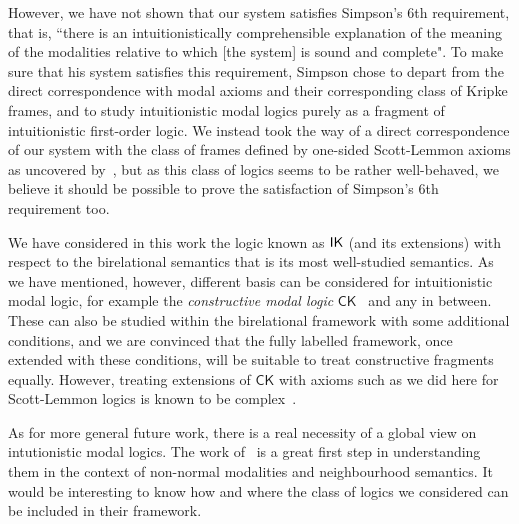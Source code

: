 However, we have not shown that our system satisfies Simpson's 6th requirement, that is, ``there is an intuitionistically comprehensible explanation of the meaning of the modalities relative to which [the system] is sound and complete".
%
To make sure that his system satisfies this requirement, Simpson chose to depart from the direct correspondence with modal axioms and their corresponding class of Kripke frames, and to study intuitionistic modal logics purely as a fragment of intuitionistic first-order logic.
%
We instead took the way of a direct correspondence of our system with the class of frames defined by one-sided Scott-Lemmon axioms as uncovered by~\cite{plotkin:stirling:86}, but as this class of logics seems to be rather well-behaved, we believe it should be possible to prove the satisfaction of Simpson's 6th requirement too.

We have considered in this work the logic known as $\mathsf{IK}$ (and its extensions) with respect to the birelational semantics that is its most well-studied semantics.
%
As we have mentioned, however, different basis can be considered for intuitionistic modal logic, for example the \emph{constructive modal logic} $\mathsf{CK}$~\cite{bierman:depaiva:sl00,mendler:scheele:ic11} and any in between.
%
These can also be studied within the birelational framework with some additional conditions, and we are convinced that the fully labelled framework, once extended with these conditions, will be suitable to treat constructive fragments equally.
%
However, treating extensions of $\mathsf{CK}$ with axioms such as we did here for Scott-Lemmon logics is known to be complex~\cite{arisaka:etal:lmcs15}.

As for more general future work, there is a real necessity of a global view on intutionistic modal logics.
%
The work of~\cite{dalmonte:grellois:olivetti:arxiv19} is a great first step in understanding them in the context of non-normal modalities and neighbourhood semantics.
%
It would be interesting to know how and where the class of logics we considered can be included in their framework.

 



